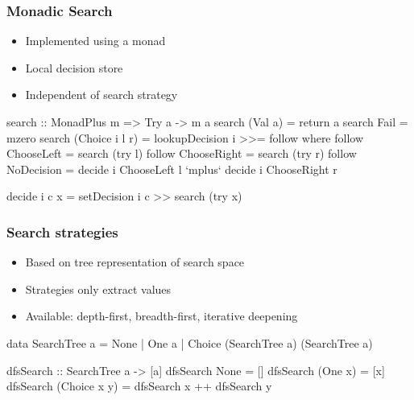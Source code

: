 \documentclass[%
,hyperref={pdfpagelabels=false}
,utf8
]{beamer}
\begin{document}
\begin{frame}[fragile]%
\frametitle{Monadic Search}

\begin{itemize}
  \item Implemented using a  monad
  \item Local decision store
  \item Independent of search strategy
\end{itemize}

\begin{haskell}
search :: MonadPlus m => Try a -> m a
search (Val a)        = return a
search Fail           = mzero
search (Choice i l r) = lookupDecision i >>= follow
  where
  follow ChooseLeft  = search (try l)
  follow ChooseRight = search (try r)
  follow NoDecision  = decide i ChooseLeft  l
               `mplus` decide i ChooseRight r

  decide i c x = setDecision i c >> search (try x)
\end{haskell}
\end{frame}

\begin{frame}[fragile]%
\frametitle{Search strategies}
\begin{itemize}
  \item Based on tree representation of search space
  \item Strategies only extract values
  \item Available: depth-first, breadth-first, iterative deepening
\end{itemize}

\begin{haskell}[SearchTree]
data SearchTree a = None
                  | One a
                  | Choice (SearchTree a) (SearchTree a)
\end{haskell}

\begin{haskell}
dfsSearch :: SearchTree a -> [a]
dfsSearch None         = []
dfsSearch (One      x) = [x]
dfsSearch (Choice x y) = dfsSearch x ++ dfsSearch y
\end{haskell}
\end{frame}
\end{document}
